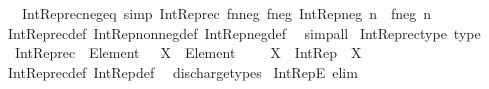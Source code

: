 \begin{isabellebody}
\ \ \ Int{\isacharunderscore}{\kern0pt}Rep{\isacharunderscore}{\kern0pt}rec{\isacharunderscore}{\kern0pt}neg{\isacharunderscore}{\kern0pt}eq\ {\isacharbrackleft}{\kern0pt}simp{\isacharbrackright}{\kern0pt}{\isacharcolon}{\kern0pt}\ {\isachardoublequoteopen}Int{\isacharunderscore}{\kern0pt}Rep{\isacharunderscore}{\kern0pt}rec\ f{\isacharunderscore}{\kern0pt}nneg\ f{\isacharunderscore}{\kern0pt}neg\ {\isacharparenleft}{\kern0pt}Int{\isacharunderscore}{\kern0pt}Rep{\isacharunderscore}{\kern0pt}neg\ n{\isacharparenright}{\kern0pt}\ {\isacharequal}{\kern0pt}\ f{\isacharunderscore}{\kern0pt}neg\ n{\isachardoublequoteclose}\isanewline
%
\isadelimproof
\ \ %
\endisadelimproof
%
\isatagproof
{}\isamarkupfalse%
\ Int{\isacharunderscore}{\kern0pt}Rep{\isacharunderscore}{\kern0pt}rec{\isacharunderscore}{\kern0pt}def\ Int{\isacharunderscore}{\kern0pt}Rep{\isacharunderscore}{\kern0pt}nonneg{\isacharunderscore}{\kern0pt}def\ Int{\isacharunderscore}{\kern0pt}Rep{\isacharunderscore}{\kern0pt}neg{\isacharunderscore}{\kern0pt}def\ \isamarkupfalse%
\ simp{\isacharunderscore}{\kern0pt}all%
\endisatagproof
{\isafoldproof}%
%
\isadelimproof
\isanewline
%
\endisadelimproof
\isanewline
{}\isamarkupfalse%
\ Int{\isacharunderscore}{\kern0pt}Rep{\isacharunderscore}{\kern0pt}rec{\isacharunderscore}{\kern0pt}type\ {\isacharbrackleft}{\kern0pt}type{\isacharbrackright}{\kern0pt}{\isacharcolon}{\kern0pt}\isanewline
\ \ {\isachardoublequoteopen}Int{\isacharunderscore}{\kern0pt}Rep{\isacharunderscore}{\kern0pt}rec\ {\isacharcolon}{\kern0pt}\ {\isacharparenleft}{\kern0pt}Element\ {\isasymnat}\ {\isasymRightarrow}\ X{\isacharparenright}{\kern0pt}\ {\isasymRightarrow}\ {\isacharparenleft}{\kern0pt}Element\ {\isacharparenleft}{\kern0pt}{\isasymnat}\ {\isasymsetminus}\ {\isacharbraceleft}{\kern0pt}{}{\isacharbraceright}{\kern0pt}{\isacharparenright}{\kern0pt}\ {\isasymRightarrow}\ X{\isacharparenright}{\kern0pt}\ {\isasymRightarrow}\ Int{\isacharunderscore}{\kern0pt}Rep\ {\isasymRightarrow}\ X{\isachardoublequoteclose}\isanewline
%
\isadelimproof
\ \ %
\endisadelimproof
%
\isatagproof
{}\isamarkupfalse%
\ Int{\isacharunderscore}{\kern0pt}Rep{\isacharunderscore}{\kern0pt}rec{\isacharunderscore}{\kern0pt}def\ Int{\isacharunderscore}{\kern0pt}Rep{\isacharunderscore}{\kern0pt}def\ \isamarkupfalse%
\ discharge{\isacharunderscore}{\kern0pt}types%
\endisatagproof
{\isafoldproof}%
%
\isadelimproof
\isanewline
%
\endisadelimproof
\isanewline
{}\isamarkupfalse%
\ Int{\isacharunderscore}{\kern0pt}RepE\ {\isacharbrackleft}{\kern0pt}elim{\isacharbrackright}{\kern0pt}{\isacharcolon}{\kern0pt}\isanewline

\end{isabellebody}
